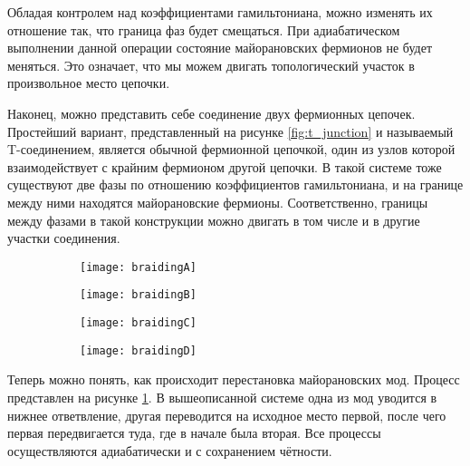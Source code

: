 \documentclass[a4paper,12pt]{article}
\theoremstyle{plain} %
\theoremstyle{definition} %
\theoremstyle{remark} %
\begin{document}
Обладая контролем над коэффициентами гамильтониана, можно изменять их отношение так, что граница фаз будет смещаться. При адиабатическом выполнении данной операции состояние майорановских фермионов не будет меняться. Это означает, что мы можем двигать топологический участок в произвольное место цепочки.

Наконец, можно представить себе соединение двух фермионных цепочек. Простейший вариант, представленный на рисунке \ref{fig:t_junction} и называемый T-соединением, является обычной фермионной цепочкой, один из узлов которой взаимодействует с крайним фермионом другой цепочки. В такой системе тоже существуют две фазы по отношению коэффициентов гамильтониана, и на границе между ними находятся майорановские фермионы. Соответственно, границы между фазами в такой конструкции можно двигать в том числе и в другие участки соединения.

\begin{figure}
    \centering
    \begin{subfigure}{0.25\textwidth}
        \centering
        \texttt{[image: braidingA]}
    \end{subfigure}%
    \begin{subfigure}{0.25\textwidth}
        \centering
        \vspace{10pt}
        \texttt{[image: braidingB]}
    \end{subfigure}%
    \begin{subfigure}{0.25\textwidth}
        \centering
        \texttt{[image: braidingC]}
    \end{subfigure}%
    \begin{subfigure}{0.25\textwidth}
        \centering
        \texttt{[image: braidingD]}
    \end{subfigure}%
    \label{fig:braiding}
\end{figure}

Теперь можно понять, как происходит перестановка майорановских мод. Процесс представлен на рисунке \ref{fig:braiding}. В вышеописанной системе одна из мод уводится в нижнее ответвление, другая переводится на исходное место первой, после чего первая передвигается туда, где в начале была вторая. Все процессы осуществляются адиабатически и с сохранением чётности.

\end{document}
